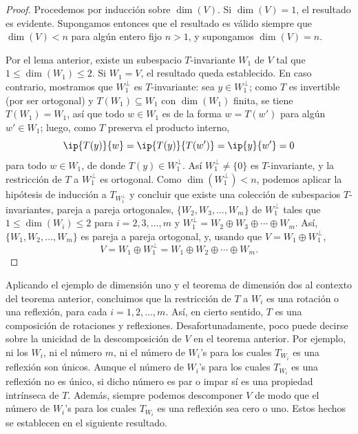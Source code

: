 \begin{proof}
    Procedemos por inducción sobre $\dim(V)$. Si $\dim(V)=1$, el resultado es evidente. Supongamos entonces que el resultado es válido siempre que $\dim(V)<n$ para algún entero fijo $n>1$, y supongamos $\dim(V)=n$.

    Por el lema anterior, existe un subespacio $T$-invariante $W_1$ de $V$ tal que $1\leq\dim(W_1)\leq 2$. Si $W_1=V$, el resultado queda establecido. En caso contrario, mostramos que $W_1^\perp$ es $T$-invariante: sea $y\in W_1^\perp$; como $T$ es invertible (por ser ortogonal) y $T(W_1)\subseteq W_1$ con $\dim(W_1)$ finita, se tiene $T(W_1)=W_1$, así que todo $w\in W_1$ es de la forma $w=T(w')$ para algún $w'\in W_1$; luego, como $T$ preserva el producto interno,
    \begin{equation*}
        \ip{T(y)}{w}=\ip{T(y)}{T(w')}=\ip{y}{w'}=0
    \end{equation*}
    para todo $w\in W_1$, de donde $T(y)\in W_1^\perp$. Así $W_1^\perp\neq\{0\}$ es $T$-invariante, y la restricción de $T$ a $W_1^\perp$ es ortogonal. Como $\dim(W_1^\perp)<n$, podemos aplicar la hipótesis de inducción a $T_{W_1^\perp}$ y concluir que existe una colección de subespacios $T$-invariantes, pareja a pareja ortogonales, $\{W_2,W_3,\dots,W_m\}$ de $W_1^\perp$ tales que $1\leq\dim(W_i)\leq 2$ para $i=2,3,\dots,m$ y $W_1^\perp=W_2\oplus W_3\oplus\cdots\oplus W_m$. Así, $\{W_1,W_2,\dots,W_m\}$ es pareja a pareja ortogonal, y, usando que $V=W_1\oplus W_1^\perp$,
    \begin{equation*}
        V=W_1\oplus W_1^\perp=W_1\oplus W_2\oplus\cdots\oplus W_m.
    \end{equation*}
\end{proof}

Aplicando el ejemplo de dimensión uno y el teorema de dimensión dos al contexto del teorema anterior, concluimos que la restricción de $T$ a $W_i$ es una rotación o una reflexión, para cada $i=1,2,\dots,m$. Así, en cierto sentido, $T$ es una composición de rotaciones y reflexiones. Desafortunadamente, poco puede decirse sobre la unicidad de la descomposición de $V$ en el teorema anterior. Por ejemplo, ni los $W_i$, ni el número $m$, ni el número de $W_i$'s para los cuales $T_{W_i}$ es una reflexión son únicos. Aunque el número de $W_i$'s para los cuales $T_{W_i}$ es una reflexión no es único, si dicho número es par o impar sí es una propiedad intrínseca de $T$. Además, siempre podemos descomponer $V$ de modo que el número de $W_i$'s para los cuales $T_{W_i}$ es una reflexión sea cero o uno. Estos hechos se establecen en el siguiente resultado.

